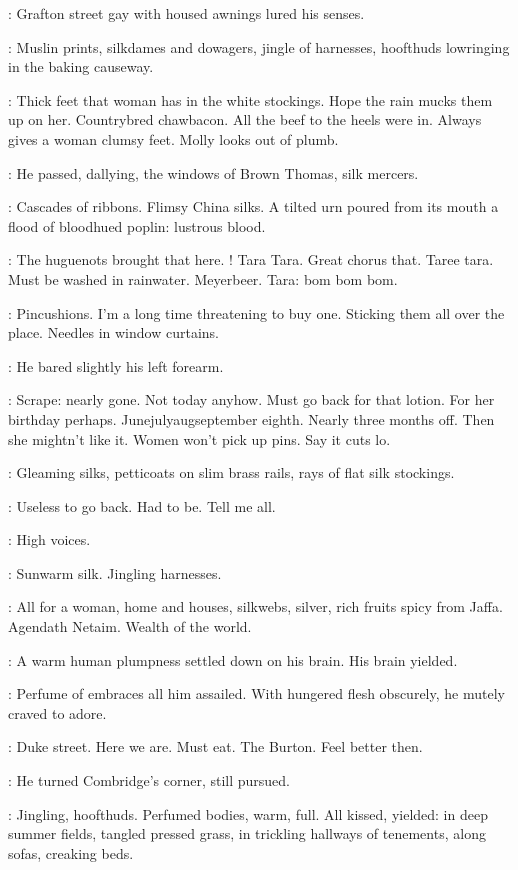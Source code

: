:
Grafton street gay with housed awnings lured his senses.

:
Muslin prints, silkdames and dowagers,
jingle of harnesses,
hoofthuds lowringing in the baking causeway.

\BloomInt:
Thick feet that woman has in the white stockings.
Hope the rain mucks them up on her.
Countrybred chawbacon.
All the beef to the heels were in.
Always gives a woman clumsy feet.
Molly looks out of plumb.

:
He passed, dallying,
the windows of Brown Thomas, silk mercers.

:
Cascades of ribbons.
Flimsy China silks.
A tilted urn poured from its mouth a flood of bloodhued poplin:
lustrous blood.

\BloomInt:
The huguenots brought that here.
!
Tara Tara.
Great chorus that.
Taree tara.
Must be washed in rainwater.
Meyerbeer.
Tara:
bom bom bom.

\BloomInt:
Pincushions.
I'm a long time threatening to buy one.
Sticking them all over the place.
Needles in window curtains.

:
He bared slightly his left forearm.

\BloomInt:
Scrape: nearly gone.
Not today anyhow.
Must go back for that lotion.
For her birthday perhaps.
Junejulyaugseptember eighth.
Nearly three months off.
Then she mightn't like it.
Women won't pick up pins.
Say it cuts lo.

:
Gleaming silks,
petticoats on slim brass rails,
rays of flat silk stockings.

\BloomInt:
Useless to go back.
Had to be.
Tell me all.

\BloomInt:
High voices.

:
Sunwarm silk.
Jingling harnesses.

\BloomInt:
All for a woman,
home and houses,
silkwebs, silver,
rich fruits spicy from Jaffa.
Agendath Netaim.
Wealth of the world.

:
A warm human plumpness settled down on his brain.
His brain yielded.

:
Perfume of embraces all him assailed.
With hungered flesh obscurely,
he mutely craved to adore.

\BloomInt:
Duke street.
Here we are.
Must eat.
The Burton.
Feel better then.

:
He turned Combridge's corner, still pursued.

\BloomInt:
Jingling, hoofthuds.
Perfumed bodies, warm, full.
All kissed, yielded:
in deep summer fields,
tangled pressed grass,
in trickling hallways of tenements,
along sofas, creaking beds.

